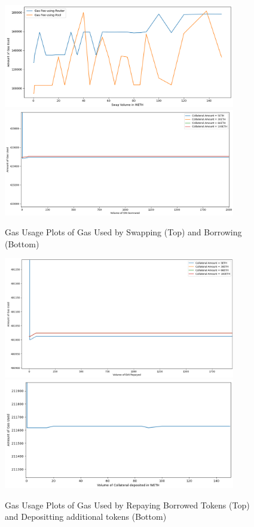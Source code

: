 \begin{figure}[!htb]
    \centering
    \includegraphics[width=0.9\textwidth]{project/Images/SwapFeesPlot.png}\\
    \includegraphics[width=0.9\textwidth]{project/Images/BorrowFees2.png}
    \caption{Gas Usage Plots of Gas Used by Swapping (Top) and Borrowing (Bottom) \label{fig:gasPlots1}}
\end{figure}

\begin{figure}[!htb]
    \centering
    \includegraphics[width=0.9\textwidth]{project/Images/RepayFees2.png}\\
    \includegraphics[width=0.9\textwidth]{project/Images/depositFeesPlot2.png}
    \caption{Gas Usage Plots of Gas Used by Repaying Borrowed Tokens (Top) and Depositting additional tokens (Bottom) \label{fig:gasPlots2}}
\end{figure}

